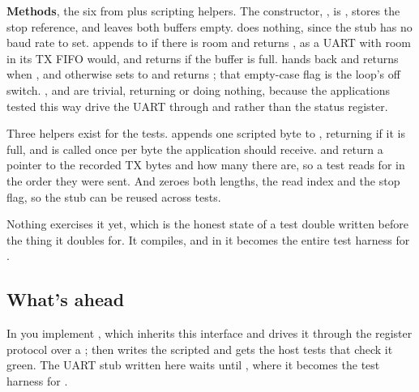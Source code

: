 \textbf{Methods}, the six from  plus scripting helpers. The
constructor, , is , stores the stop reference, and leaves both
buffers empty.  does nothing, since the stub has no baud rate to set.
 appends  to  if there is room and returns
, as a UART with room in its TX FIFO would, and returns  if the buffer is
full.  hands back  and returns  when
, and otherwise sets  to  and returns ;
that empty-case flag is the loop's off switch. ,  and
 are trivial, returning  or doing nothing, because the applications
tested this way drive the UART through  and  rather than the status
register.

Three helpers exist for the tests.  appends one scripted byte to
, returning  if it is full, and is called once per byte the application
should receive.  and  return a pointer to the recorded TX bytes and how
many there are, so a test reads  for  in the order they were
sent. And  zeroes both lengths, the read index and the stop flag, so the stub can be
reused across tests.

Nothing exercises it yet, which is the honest state of a test double written before the thing it
doubles for. It compiles, and in  it becomes the entire test harness for
.

\subsection*{What's ahead}
In  you implement , which inherits this interface and drives it
through the register protocol over a ;  then writes the
scripted  and gets the host tests that check it green. The UART stub
written here waits until , where it becomes the test harness for .
